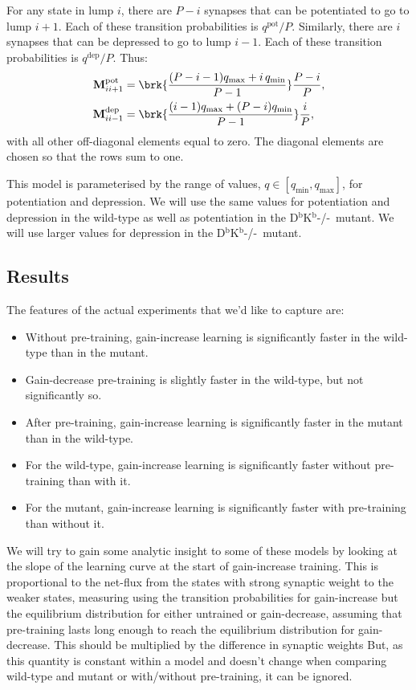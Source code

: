 \documentclass[12pt]{article}
\newcommand{\M}{\mathbf{M}}
\newcommand{\pot}{^{\text{pot}}}
\newcommand{\dep}{^{\text{dep}}}
\newcommand{\KO}{D$^\mathrm{b}$K$^\mathrm{b}$-/-}
\newcommand{\lmax}{_{\text{max}}}
\newcommand{\lmin}{_{\text{min}}}
\begin{document}
For any state in lump $i$, there are $P-i$ synapses that can be potentiated to go to lump $i+1$.
Each of these transition probabilities is $q\pot/P$.
Similarly, there are $i$ synapses that can be depressed to go to lump $i-1$.
Each of these transition probabilities is $q\dep/P$.
Thus:
%
\begin{equation}\label{eq:pooledpotdep}
  \begin{aligned}
    \M\pot_{ii+1} &=  \brk{\frac{(P-i-1)q\lmax + i\,q\lmin}{P-1}} \frac{P-i}{P}, \\
    \M\dep_{ii-1} &=  \brk{\frac{(i-1)q\lmax + (P-i)q\lmin}{P-1}} \frac{i}{P},
  \end{aligned}
\end{equation}
%
with all other off-diagonal elements equal to zero.
The diagonal elements are chosen so that the rows sum to one.

This model is parameterised by the range of values, $q\in[q\lmin,q\lmax]$, for potentiation and depression.
We will use the same values for potentiation and depression in the wild-type as well as potentiation in the \KO\ mutant.
We will use larger values for depression in the \KO\ mutant.


\subsection{Results}\label{sec:results}

The features of the actual experiments that we'd like to capture are:
\begin{itemize}
  \item Without pre-training, gain-increase learning is significantly faster in the wild-type than in the mutant.
  \item Gain-decrease pre-training is slightly faster in the wild-type, but not significantly so.
  \item After pre-training, gain-increase learning is significantly faster in the mutant than in the wild-type.
  \item For the wild-type, gain-increase learning is significantly faster without pre-training than with it.
  \item For the mutant, gain-increase learning is significantly faster with pre-training than without it.
\end{itemize}

We will try to gain some analytic insight to some of these models by looking at the slope of the learning curve at the start of gain-increase training.
This is proportional to the net-flux from the states with strong synaptic weight to the weaker states, measuring using the transition probabilities for gain-increase but the equilibrium distribution for either untrained or gain-decrease, assuming that pre-training lasts long enough to reach the equilibrium distribution for gain-decrease.
This should be multiplied by the difference in synaptic weights
But, as this quantity is constant within a model and doesn't change when comparing wild-type and mutant or with/without pre-training, it can be ignored.
\end{document}
